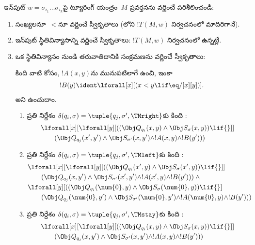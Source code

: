 \documentclass[../../../include/open-logic-section]{subfiles}
\begin{document}
ఇన్‌పుట్ $w=\sigma_{i_1}\dots\sigma_{i_k}$పై ట్యూరింగ్ యంత్రం~$M$ ప్రవర్తనను
వర్ణించే  పరిశీలించండి:
\begin{enumerate}
\item సంఖ్యలనూ~$<$నూ వర్ణించే స్వీకృతాలు
  (లోని $!T(M,w)$ నిర్వచనంలో మాదిరిగానే).
\item ఇన్‌పుట్ స్థితివిన్యాసాన్ని వర్ణించే స్వీకృతాలు: $!T(M,w)$ నిర్వచనంలో
  ఉన్నట్లే.
\item ఒక స్థితివిన్యాసం నుండి తరువాతిదానికి సంక్రమణను వర్ణించే స్వీకృతాలు:

కింది వాటి కోసం, $!A(x,y)$ను మునుపటిలాగే ఉంచి, ఇంకా
\[
  !B(y) \ident \lforall[x][(x < y \lif \eq/[x][y])].
\]
అని ఉంచుదాం.
\begin{enumerate}
\item {} ప్రతి నిర్దేశం $\delta(q_i,\sigma)=
  \tuple{q_j,\sigma',\TMright}$కు కింది :
\begin{align*}
& \lforall[x][\lforall[y][(
   (\Obj Q_{q_i}(x, y) \land \Obj S_{\sigma}(x, y)) \lif {}]] \\
&\qquad   (\Obj Q_{q_j}(x', y') \land \Obj S_{\sigma'}(x, y') \land
!A(x, y) \land !B(y')))
\end{align*}
\item {} ప్రతి నిర్దేశం $\delta(q_i,\sigma)=
  \tuple{q_j,\sigma',\TMleft}$కు కింది :
\begin{align*}
& \lforall[x][\lforall[y][
    ((\Obj Q_{q_i}(x', y) \land \Obj S_{\sigma}(x', y)) \lif {}]]\\
& \qquad   (\Obj Q_{q_j}(x, y') \land \Obj S_{\sigma'}(x', y') \land
!A(x', y) \land !B(y'))) \land {}\\
& \lforall[y][((\Obj Q_{q_i}(\num{0}, y) \land \Obj S_{\sigma}(\num{0},
    y)) \lif {}]\\
& \qquad (\Obj Q_{q_j}(\num{0}, y') \land \Obj S_{\sigma'}(\num{0},
  y') \land !A(\num{0}, y) \land !B(y')))
\end{align*}
\item {} ప్రతి నిర్దేశం $\delta(q_i,\sigma)=
  \tuple{q_j,\sigma',\TMstay}$కు కింది :
\begin{align*}
& \lforall[x][\lforall[y][(
   (\Obj Q_{q_i}(x, y) \land \Obj S_{\sigma}(x, y)) \lif {}]] \\
&\qquad (\Obj Q_{q_j}(x, y') \land \Obj S_{\sigma'}(x, y') \land
!A(x, y) \land !B(y')))
\end{align*}

\end{enumerate}
\end{enumerate}
\end{document}
